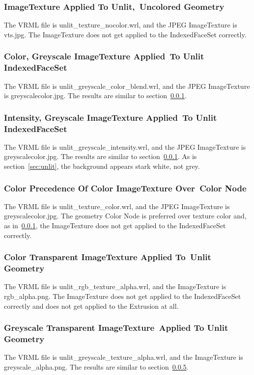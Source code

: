 \documentclass[12pt,letterpaper]{article}
\newcommand{\AppGa}{ImageTexture Applied To Unlit,~}
\newcommand{\AppGb}{Uncolored Geometry}
\newcommand{\AppHa}{Color, Greyscale ImageTexture Applied~}
\newcommand{\AppHb}{To Unlit IndexedFaceSet}
\newcommand{\AppIa}{Intensity, Greyscale ImageTexture Applied~}
\newcommand{\AppIb}{To Unlit IndexedFaceSet}
\newcommand{\AppJa}{Color Precedence Of Color ImageTexture Over~}
\newcommand{\AppJb}{Color Node}
\newcommand{\AppKa}{Color Transparent ImageTexture Applied To~}
\newcommand{\AppKb}{Unlit Geometry}
\newcommand{\AppLa}{Greyscale Transparent ImageTexture~}
\newcommand{\AppLb}{Applied To Unlit Geometry}
\begin{document}
\subsubsection{\AppGa\AppGb}
\label{sec:unlit-texture-nocolor}
The VRML file is unlit\_texture\_nocolor.wrl, and the JPEG ImageTexture is vts.jpg.\newline
The ImageTexture does not get applied to the IndexedFaceSet correctly.

\subsubsection{\AppHa\AppHb}
The VRML file is unlit\_greyscale\_color\_blend.wrl, and the JPEG ImageTexture
is greyscalecolor.jpg.\newline
The results are similar to section~\ref{sec:unlit-texture-nocolor}.

\subsubsection{\AppIa\AppIb}
The VRML file is unlit\_greyscale\_intensity.wrl, and the JPEG ImageTexture
is greyscalecolor.jpg.\newline
The results are similar to section~\ref{sec:unlit-texture-nocolor}.
As is section~\ref{sec:unlit}, the background appears stark white, not grey.

\subsubsection{\AppJa\AppJb}
The VRML file is unlit\_texture\_color.wrl, and the JPEG ImageTexture
is greyscalecolor.jpg.\newline
The geometry Color Node is preferred over texture color and, as
in~\ref{sec:unlit-texture-nocolor}, the ImageTexture does not get
applied to the IndexedFaceSet correctly.

\subsubsection{\AppKa\AppKb}
\label{sec:unlit-rgb-texture}
The VRML file is unlit\_rgb\_texture\_alpha.wrl, and the ImageTexture
is rgb\_alpha.png.\newline
The ImageTexture does not get applied to the IndexedFaceSet correctly
and does not get applied to the Extrusion at all.

\subsubsection{\AppLa\AppLb}
The VRML file is unlit\_greyscale\_texture\_alpha.wrl, and the ImageTexture
is greyscale\_alpha.png.\newline
The results are similar to section~\ref{sec:unlit-rgb-texture}.
\end{document}
